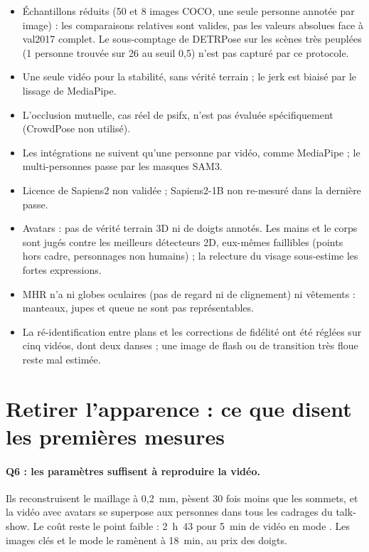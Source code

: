 \documentclass[11pt,a4paper]{report}
\newcommand{\code}[1]{\texttt{\detokenize{#1}}}
\begin{document}
\begin{itemize}
    \item Échantillons réduits (50 et 8 images COCO, une seule personne annotée par image) : les comparaisons
    relatives sont valides, pas les valeurs absolues face à val2017 complet. Le sous-comptage de DETRPose sur les
    scènes très peuplées (1 personne trouvée sur 26 au seuil 0,5) n'est pas capturé par ce protocole.
    \item Une seule vidéo pour la stabilité, sans vérité terrain ; le jerk est biaisé par le lissage de MediaPipe.
    \item L'occlusion mutuelle, cas réel de psifx, n'est pas évaluée spécifiquement (CrowdPose non utilisé).
    \item Les intégrations ne suivent qu'une personne par vidéo, comme MediaPipe ; le multi-personnes passe par les
    masques SAM3.
    \item Licence de Sapiens2 non validée ; Sapiens2-1B non re-mesuré dans la dernière passe.
    \item Avatars : pas de vérité terrain 3D ni de doigts annotés. Les mains et le corps sont jugés contre les meilleurs détecteurs
    2D, eux-mêmes faillibles (points hors cadre, personnages non humains) ; la relecture du visage sous-estime les fortes
    expressions.
    \item MHR n'a ni globes oculaires (pas de regard ni de clignement) ni vêtements : manteaux, jupes et queue ne sont pas
    représentables.
    \item La ré-identification entre plans et les corrections de fidélité ont été réglées sur cinq vidéos, dont deux danses ; une image
    de flash ou de transition très floue reste mal estimée.
\end{itemize}

\section{Retirer l'apparence : ce que disent les premières mesures}
\label{sec:disc-avatars}

\paragraph{Q6 : les paramètres suffisent à reproduire la vidéo.} Ils reconstruisent le maillage à 0,2~mm, pèsent 30 fois moins que
les sommets, et la vidéo avec avatars se superpose aux personnes dans tous les cadrages du talk-show. Le coût reste le point faible :
2~h~43 pour 5~min de vidéo en mode \code{full}. Les images clés et le mode \code{body} le ramènent à 18~min, au prix des doigts.
\end{document}
